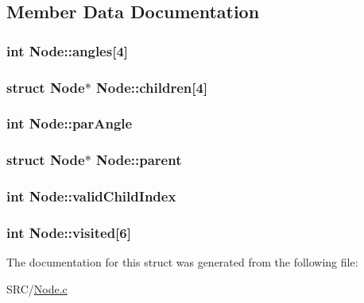 \subsection{Member Data Documentation}
\hypertarget{struct_node_ac5a8aacfe227928bca29c6d4f0eee7da}{
\subsubsection[{angles}]{\setlength{\rightskip}{0pt plus 5cm}int {\bf Node::angles}\mbox{[}4\mbox{]}}}
\label{struct_node_ac5a8aacfe227928bca29c6d4f0eee7da}
\hypertarget{struct_node_aa580e214047863941be220659fab2bc6}{
\subsubsection[{children}]{\setlength{\rightskip}{0pt plus 5cm}struct {\bf Node}$\ast$ {\bf Node::children}\mbox{[}4\mbox{]}}}
\label{struct_node_aa580e214047863941be220659fab2bc6}
\hypertarget{struct_node_abea6b2e2a8f028c630305ff20eff3ad9}{
\subsubsection[{parAngle}]{\setlength{\rightskip}{0pt plus 5cm}int {\bf Node::parAngle}}}
\label{struct_node_abea6b2e2a8f028c630305ff20eff3ad9}
\hypertarget{struct_node_a34f3ab9670c7b70dad8905359a243c92}{
\subsubsection[{parent}]{\setlength{\rightskip}{0pt plus 5cm}struct {\bf Node}$\ast$ {\bf Node::parent}}}
\label{struct_node_a34f3ab9670c7b70dad8905359a243c92}
\hypertarget{struct_node_ad173711c9173521a74985ec03b9b93e0}{
\subsubsection[{validChildIndex}]{\setlength{\rightskip}{0pt plus 5cm}int {\bf Node::validChildIndex}}}
\label{struct_node_ad173711c9173521a74985ec03b9b93e0}
\hypertarget{struct_node_a977a4af32ecfaab42197c992629c9f0d}{
\subsubsection[{visited}]{\setlength{\rightskip}{0pt plus 5cm}int {\bf Node::visited}\mbox{[}6\mbox{]}}}
\label{struct_node_a977a4af32ecfaab42197c992629c9f0d}


The documentation for this struct was generated from the following file:\begin{DoxyCompactItemize}
\item 
SRC/\hyperlink{_node_8c}{Node.c}\end{DoxyCompactItemize}

